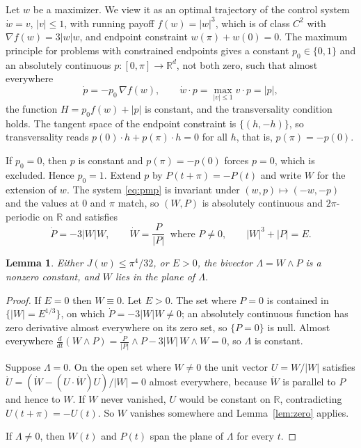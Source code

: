 \documentclass[11pt]{amsart}
\newtheorem{lemma}[theorem]{Lemma}
\theoremstyle{definition}
\theoremstyle{remark}
\newcommand{\R}{\mathbb{R}}
\begin{document}
Let $w$ be a maximizer. We view it as an optimal trajectory of the control system $\dot w=v$, $|v|\le1$, with running payoff $f(w)=|w|^3$, which is of class $C^2$ with $\nabla f(w)=3|w|w$, and endpoint constraint $w(\pi)+w(0)=0$. The maximum principle for problems with constrained endpoints \cite[Ch.~I and II]{PBGM62} gives a constant $p_0\in\{0,1\}$ and an absolutely continuous $p\colon[0,\pi]\to\R^d$, not both zero, such that almost everywhere
\begin{equation}\label{eq:pmp}
\dot p=-p_0\,\nabla f(w),\qquad \dot w\cdot p=\max_{|v|\le1}v\cdot p=|p|,
\end{equation}
the function $H=p_0f(w)+|p|$ is constant, and the transversality condition holds. The tangent space of the endpoint constraint is $\{(h,-h)\}$, so transversality reads $p(0)\cdot h+p(\pi)\cdot h=0$ for all $h$, that is, $p(\pi)=-p(0)$.

If $p_0=0$, then $p$ is constant and $p(\pi)=-p(0)$ forces $p=0$, which is excluded. Hence $p_0=1$. Extend $p$ by $P(t+\pi)=-P(t)$ and write $W$ for the extension of $w$. The system \eqref{eq:pmp} is invariant under $(w,p)\mapsto(-w,-p)$ and the values at $0$ and $\pi$ match, so $(W,P)$ is absolutely continuous and $2\pi$-periodic on $\R$ and satisfies
\begin{equation}\label{eq:ham}
\dot P=-3|W|W,\qquad \dot W=\frac{P}{|P|}\ \text{ where }P\neq0,\qquad |W|^3+|P|=E .
\end{equation}

\begin{lemma}\label{lem:integrals}
Either $J(w)\le\pi^4/32$, or $E>0$, the bivector $\Lambda=W\wedge P$ is a nonzero constant, and $W$ lies in the plane of $\Lambda$.
\end{lemma}

\begin{proof}
If $E=0$ then $W\equiv0$. Let $E>0$. The set where $P=0$ is contained in $\{|W|=E^{1/3}\}$, on which $\dot P=-3|W|W\neq0$; an absolutely continuous function has zero derivative almost everywhere on its zero set, so $\{P=0\}$ is null. Almost everywhere $\frac{d}{dt}(W\wedge P)=\frac{P}{|P|}\wedge P-3|W|\,W\wedge W=0$, so $\Lambda$ is constant.

Suppose $\Lambda=0$. On the open set where $W\neq0$ the unit vector $U=W/|W|$ satisfies $\dot U=(\dot W-(U\cdot\dot W)U)/|W|=0$ almost everywhere, because $\dot W$ is parallel to $P$ and hence to $W$. If $W$ never vanished, $U$ would be constant on $\R$, contradicting $U(t+\pi)=-U(t)$. So $W$ vanishes somewhere and Lemma~\ref{lem:zero} applies.

If $\Lambda\neq0$, then $W(t)$ and $P(t)$ span the plane of $\Lambda$ for every $t$.
\end{proof}
\end{document}
